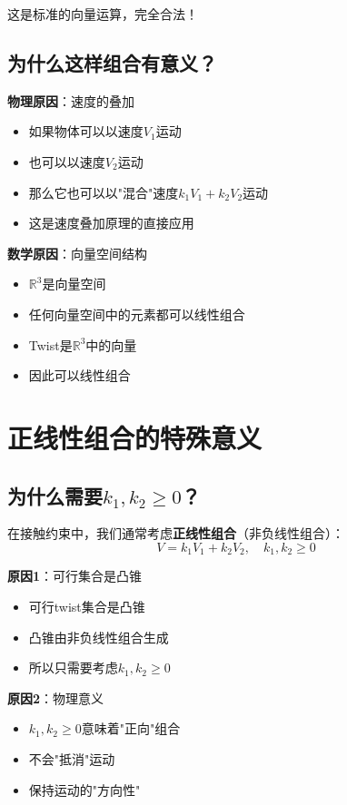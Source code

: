 \documentclass[12pt,a4paper]{article}
\begin{document}
这是标准的向量运算，完全合法！

\subsection{为什么这样组合有意义？}

\textbf{物理原因}：速度的叠加

\begin{itemize}
\item 如果物体可以以速度$V_1$运动
\item 也可以以速度$V_2$运动
\item 那么它也可以以"混合"速度$k_1 V_1 + k_2 V_2$运动
\item 这是速度叠加原理的直接应用
\end{itemize}

\textbf{数学原因}：向量空间结构

\begin{itemize}
\item $\mathbb{R}^3$是向量空间
\item 任何向量空间中的元素都可以线性组合
\item Twist是$\mathbb{R}^3$中的向量
\item 因此可以线性组合
\end{itemize}

\section{正线性组合的特殊意义}

\subsection{为什么需要$k_1, k_2 \geq 0$？}

在接触约束中，我们通常考虑\textbf{正线性组合}（非负线性组合）：
\begin{equation}
V = k_1 V_1 + k_2 V_2, \quad k_1, k_2 \geq 0
\end{equation}

\textbf{原因1}：可行集合是凸锥

\begin{itemize}
\item 可行twist集合是凸锥
\item 凸锥由非负线性组合生成
\item 所以只需要考虑$k_1, k_2 \geq 0$
\end{itemize}

\textbf{原因2}：物理意义

\begin{itemize}
\item $k_1, k_2 \geq 0$意味着"正向"组合
\item 不会"抵消"运动
\item 保持运动的"方向性"
\end{itemize}
\end{document}
